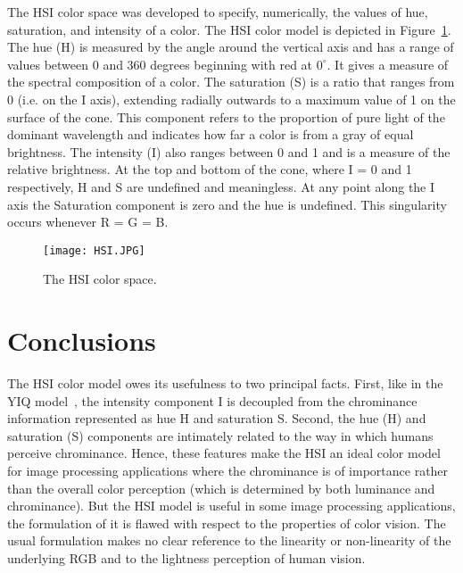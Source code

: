 \documentclass[10pt,twocolumn,letterpaper]{article}
\begin{document}
\par The HSI color space was developed to specify, numerically, the values of hue, saturation, and intensity of a color. The HSI color model is depicted in Figure~\ref{fig:onecol}. The hue (H) is measured by the angle around the vertical axis and has a range of values between 0 and 360 degrees beginning with red at $0^{\circ}$. It gives a measure of the spectral composition of a color. The saturation (S) is a ratio that ranges from 0 (i.e. on the I axis), extending radially outwards to a maximum value of 1 on the surface of the cone. This component refers to the proportion of pure light of the dominant wavelength and indicates how far a color is from a gray of equal brightness. The intensity (I) also ranges between 0 and 1 and is a measure of the relative brightness. At the top and bottom of the cone, where I = 0 and 1 respectively, H and S are undefined and meaningless. At any point along the I axis the Saturation component is zero and the hue is undefined. This singularity occurs whenever R = G = B.

\begin{figure}[t]
\begin{center}
\texttt{[image: HSI.JPG]}
\end{center}
 \caption{The HSI color space.}
\label{fig:long}
\label{fig:onecol}
\end{figure}
\section{Conclusions}
The HSI color model owes its usefulness to two principal facts. First, like in the YIQ model~\cite{kohda2000digital}, the intensity component I is decoupled from the chrominance information represented as hue H and saturation S. Second, the hue (H) and saturation (S) components are intimately related to the way in which humans perceive chrominance. Hence, these features make the HSI an ideal color model for image processing applications where the chrominance is of importance rather than the overall color perception (which is determined by both luminance and chrominance). But the HSI model is useful in some image processing applications, the formulation of it is flawed with respect to the properties of color vision. The usual formulation makes no clear reference to the linearity or non-linearity of the underlying RGB and to the lightness perception of human vision.

{\small


}
\end{document}
